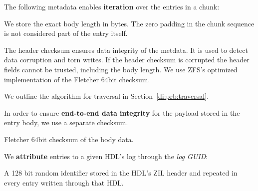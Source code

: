 \documentclass[12pt,a4paper,twoside]{book}
\begin{document}
The following metadata enables \textbf{iteration} over the entries in a chunk:
\begin{description}[noitemsep,leftmargin=1.5cm,labelindent=1cm]
    \item[Body Length] We store the exact body length in bytes. The zero padding in the chunk sequence is not considered part of the entry itself.
    \item[Header Checksum] The header checksum ensures data integrity of the metdata. It is used to detect data corruption and torn writes.
    If the header checksum is corrupted the header fields cannot be trusted, including the body length.
    We use ZFS's optimized implementation of the Fletcher 64bit checksum.
\end{description}
We outline the algorithm for traversal in Section~\ref{di:prb:traversal}.

In order to ensure \textbf{end-to-end data integrity} for the payload stored in the entry body, we use a separate checksum.
\begin{description}[noitemsep,leftmargin=1.5cm,labelindent=1cm]
    \item[Body Checksum] Fletcher 64bit checksum of the body data.
\end{description}

We \textbf{attribute} entries to a given HDL's log through the \textit{log GUID}:
\begin{description}[noitemsep,leftmargin=1.5cm,labelindent=1cm]
    \item[Log GUID] A 128 bit random identifier stored in the HDL's ZIL header and repeated in every entry written through that HDL.
\end{description}
\end{document}
